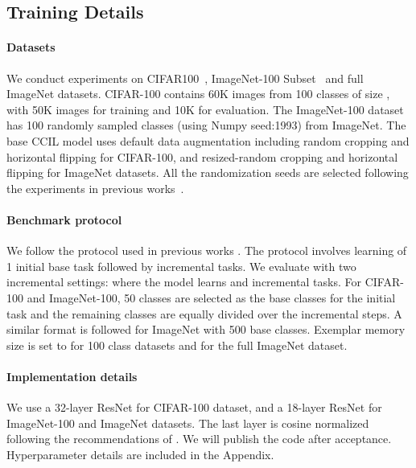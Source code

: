 \documentclass[final]{cvpr}
\newcommand{\ilkd}{CCIL }
\begin{document}
\subsection{Training Details}


\paragraph{Datasets} We conduct experiments on CIFAR100~\cite{Krizhevsky09learningmultiple}, ImageNet-100 Subset~\cite{imagenet_cvpr09} and full ImageNet datasets. CIFAR-100 contains 60K images from 100 classes of size , with 50K images for training and 10K for evaluation. The ImageNet-100 dataset has 100 randomly sampled classes (using Numpy seed:1993) from ImageNet.
The base \ilkd model uses default data augmentation including random cropping and horizontal flipping for CIFAR-100, and resized-random cropping and horizontal flipping for ImageNet datasets. All the randomization seeds are selected following the experiments in previous works~\cite{lucir, mnemonics}.




\paragraph{Benchmark protocol} We follow the protocol used in previous works \cite{lucir, mnemonics}. The protocol involves learning of 1 initial base task followed by  incremental tasks. We evaluate with two incremental settings: where the model learns  and  incremental tasks. For CIFAR-100 and ImageNet-100, 50 classes are selected as the base classes for the initial task and the remaining classes are equally divided over the incremental steps. A similar format is followed for ImageNet with 500 base classes. Exemplar memory size is set to  for 100 class datasets and  for the full ImageNet dataset.

\paragraph{Implementation details} We use a 32-layer ResNet \cite{He_2016_CVPR} for CIFAR-100 dataset, and a 18-layer ResNet for ImageNet-100 and ImageNet datasets. The last layer is cosine normalized following the recommendations of \cite{lucir}. We will publish the code after acceptance. Hyperparameter details are included in the Appendix. 





 
\end{document}
